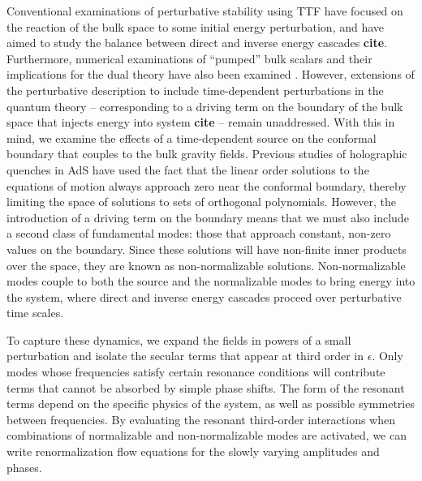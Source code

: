 \documentclass[letterpaper,11pt]{article}
\begin{document}
Conventional examinations of perturbative stability using TTF have focused on the reaction of the bulk space to some initial energy perturbation, and have aimed to study the balance between direct and inverse energy cascades {\bf cite}. Furthermore, numerical examinations of ``pumped'' bulk scalars and their implications for the dual theory have also been examined \cite{1712.07637, 1612.07701}. However, extensions of the perturbative description to include time-dependent perturbations in the quantum theory -- corresponding to a driving term on the boundary of the bulk space that injects energy into system {\bf cite} -- remain unaddressed.  With this in mind, we examine the effects of a time-dependent source on the conformal boundary that couples to the bulk gravity fields. Previous studies of holographic quenches in AdS have used the fact that the linear order solutions to the equations of motion always approach zero near the conformal boundary, thereby limiting the space of solutions to sets of orthogonal polynomials. However, the introduction of a driving term on the boundary means that we must also include a second class of fundamental modes: those that approach constant, non-zero values on the boundary. Since these solutions will have non-finite inner products over the space, they are known as non-normalizable solutions. Non-normalizable modes couple to both the source and the normalizable modes to bring energy into the system, where direct and inverse energy cascades proceed over perturbative time scales.

To capture these dynamics, we expand the fields in powers of a small perturbation and isolate the secular terms that appear at third order in $\epsilon$. Only modes whose frequencies satisfy certain resonance conditions will contribute terms that cannot be absorbed by simple phase shifts. The form of the resonant terms depend on the specific physics of the system, as well as possible symmetries between frequencies. By evaluating the resonant third-order interactions when combinations of normalizable and non-normalizable modes are activated, we can write renormalization flow equations for the slowly varying amplitudes and phases.
\end{document}
